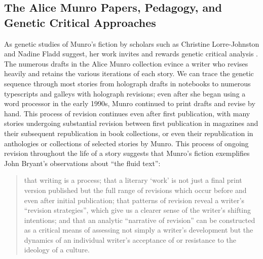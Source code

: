 \documentclass{article}
\begin{document}
\subsection*{The Alice Munro Papers, Pedagogy, and Genetic Critical
Approaches}

As genetic studies of Munro's fiction by scholars such as Christine
Lorre-Johnston and Nadine Fladd suggest, her work invites and rewards
genetic critical analysis \citep{lorre-johnston_pictures_2015,fladd_alice_2015}. The numerous drafts in the Alice Munro
collection evince a writer who revises heavily and retains the various
iterations of each story. We can trace the genetic sequence through most
stories from holograph drafts in notebooks to numerous typescripts and
galleys with holograph revisions; even after she began using a word
processor in the early 1990s, Munro continued to print drafts and revise
by hand. This process of revision continues even after first
publication, with many stories undergoing substantial revision between
first publication in magazines and their subsequent republication in
book collections, or even their republication in anthologies or
collections of selected stories by Munro. This process of ongoing
revision throughout the life of a story suggests that Munro's fiction
exemplifies John Bryant's observations about ``the fluid text'':

\begin{quote}
that writing is a process; that a literary `work' is not just a final
print version published but the full range of revisions which occur before and even after initial publication; that patterns of revision reveal a writer's ``revision strategies'', which give us a clearer sense of the writer's shifting intentions; and that an
analytic ``narrative of revision'' can be constructed as a critical means of assessing not simply a writer's development but the dynamics of an individual writer's acceptance of or resistance to the ideology of a culture.

\begin{flushright}
    \parencite[4]{bryant_melville_2008}
\end{flushright}
\end{quote}
\end{document}
